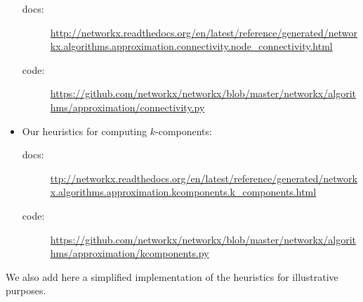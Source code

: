 \begin{itemize}
\begin{scriptsize}
\begin{description}
\item[docs:] \href{http://networkx.readthedocs.org/en/latest/reference/generated/networkx.algorithms.approximation.connectivity.node_connectivity.html}{http://networkx.readthedocs.org/en/latest/reference/generated/networkx.algorithms.approximation.connectivity.node\_connectivity.html}

\item[code:] \href{https://github.com/networkx/networkx/blob/master/networkx/algorithms/approximation/connectivity.py}{https://github.com/networkx/networkx/blob/master/networkx/algorithms/approximation/connectivity.py}

\end{description}
\end{scriptsize}

\item Our heuristics for computing $k$-components:

\begin{scriptsize}
\begin{description}

\item[docs:] \href{ttp://networkx.readthedocs.org/en/latest/reference/generated/networkx.algorithms.approximation.kcomponents.k_components.html}{ttp://networkx.readthedocs.org/en/latest/reference/generated/networkx.algorithms.approximation.kcomponents.k\_components.html}

\item[code:] \href{https://github.com/networkx/networkx/blob/master/networkx/algorithms/approximation/kcomponents.py}{https://github.com/networkx/networkx/blob/master/networkx/algorithms/approximation/kcomponents.py }

\end{description}
\end{scriptsize}

\end{itemize}

We also add here a simplified implementation of the heuristics for illustrative purposes.

\newpage

